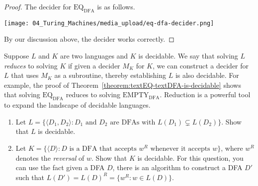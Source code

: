 \begin{proof}
The decider for $\mathrm{EQ}_\mathrm{DFA}$ is as follows.
\begin{center}
    \texttt{[image: 04\_Turing\_Machines/media\_upload/eq-dfa-decider.png]}
\end{center}

By our discussion above, the decider works correctly.

\end{proof}

\begin{important}
\label{important:Decidability-through-reductions}
Suppose $L$ and $K$ are two languages and $K$ is decidable. We say that solving $L$ \emph{reduces} to solving $K$ if given a decider $M_K$ for $K$, we can construct a decider for $L$ that uses $M_K$ as a subroutine, thereby establishing $L$ is also decidable. For example, the proof of Theorem~\ref{theorem:textEQ-textDFA-is-decidable} shows that solving $\mathrm{EQ}_\mathrm{DFA}$ reduces to solving $\mathrm{EMPTY}_\mathrm{DFA}$. Reduction is a powerful tool to expand the landscape of decidable languages.

\end{important}

\begin{exercise}
\label{exercise:Practice-with-decidability-through-reductions} 
\begin{enumerate}
    \item Let $L = \{\langle D_1, D_2 \rangle: \text{$D_1$ and $D_2$ are DFAs with $L(D_1) \subsetneq L(D_2)$}\}$. Show that $L$ is decidable.
    \item Let $K = \{\langle D \rangle: \text{$D$ is a DFA that accepts $w^R$ whenever it accepts $w$}\}$, where $w^R$ denotes the \emph{reversal} of $w$. Show that $K$ is decidable. For this question, you can use the fact given a DFA $D$, there is an algorithm to construct a DFA $D'$ such that $L(D') = L(D)^R = \{w^R : w \in L(D)\}$.
\end{enumerate}

\end{exercise}

